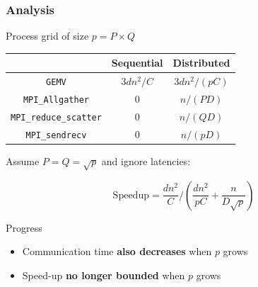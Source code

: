 \documentclass[xcolor={rgb,x11names,svgnames},rgb,x11names,svgnames]{beamer}
\begin{document}

\begin{frame}[label=2d]
  \frametitle{Analysis}

  Process grid of size $p = P \times Q$
  
  \begin{center}
    \begin{tabular}{|c||c|c|}
      \hline
      & Sequential & Distributed \\
      \hline\hline
      \texttt{GEMV}                 & $3 d n^2 / C$ & $3 d n^2 / (pC)$ \\
      \hline
      \texttt{MPI\_Allgather}       & 0             & $n / (PD)$ \\
      \hline
      \texttt{MPI\_reduce\_scatter} & 0             & $n / (QD)$ \\
      \hline
      \texttt{MPI\_sendrecv}        & 0             & $n / (pD)$ \\
      \hline
    \end{tabular}
  \end{center}

  Assume $P = Q = \sqrt{p}$ and \alert{ignore latencies}:
  
  \[
    \mathrm{Speedup} = \frac{d n^2}{C} / \left(\frac{d n^2}{pC} + \frac{n}{D\sqrt{p}}\right)
  \]

  \begin{alertblock}{Progress}
    \begin{itemize}
    \item Communication time \textbf{also decreases} when $p$ grows
    \item Speed-up \textbf{no longer bounded} when $p$ grows
    \end{itemize}
  \end{alertblock}
  
\end{frame}
\end{document}
